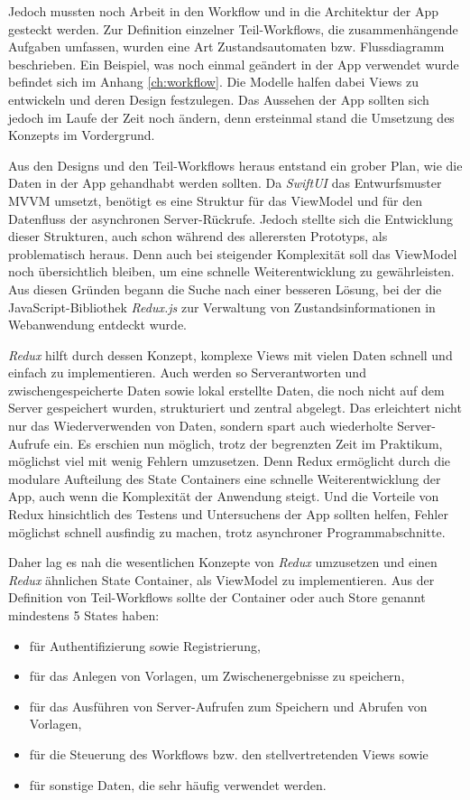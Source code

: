 \documentclass[nomenclature, oneside, 150]{HSMW-Thesis}
\begin{document}
		Jedoch mussten noch Arbeit in den Workflow und in die Architektur der App gesteckt werden. Zur Definition einzelner Teil-Workflows, die zusammenhängende Aufgaben umfassen, wurden eine Art Zustandsautomaten bzw. Flussdiagramm beschrieben. Ein Beispiel, was noch einmal geändert in der App verwendet wurde befindet sich im Anhang \ref{ch:workflow}. Die Modelle halfen dabei Views zu entwickeln und deren Design festzulegen. Das Aussehen der App sollten sich jedoch im Laufe der Zeit noch ändern, denn ersteinmal stand die Umsetzung des Konzepts im Vordergrund.

		Aus den Designs und den Teil-Workflows heraus entstand ein grober Plan, wie die Daten in der App gehandhabt werden sollten. Da \textit{SwiftUI} das Entwurfsmuster MVVM umsetzt, benötigt es eine Struktur für das ViewModel und für den Datenfluss der asynchronen Server-Rückrufe. Jedoch stellte sich die Entwicklung dieser Strukturen, auch schon während des allerersten Prototyps, als problematisch heraus. Denn auch bei steigender Komplexität soll das ViewModel noch übersichtlich bleiben, um eine schnelle Weiterentwicklung zu gewährleisten. Aus diesen Gründen begann die Suche nach einer besseren Lösung, bei der die JavaScript-Bibliothek \textit{Redux.js} zur Verwaltung von Zustandsinformationen in Webanwendung entdeckt wurde. 

		\textit{Redux} hilft durch dessen Konzept, komplexe Views mit vielen Daten schnell und einfach zu implementieren. Auch werden so Serverantworten und zwischengespeicherte Daten sowie lokal erstellte Daten, die noch nicht auf dem Server gespeichert wurden, strukturiert und zentral abgelegt. Das erleichtert nicht nur das Wiederverwenden von Daten, sondern spart auch wiederholte Server-Aufrufe ein. Es erschien nun möglich, trotz der begrenzten Zeit im Praktikum, möglichst viel mit wenig Fehlern umzusetzen. Denn Redux ermöglicht durch die modulare Aufteilung des State Containers eine schnelle Weiterentwicklung der App, auch wenn die Komplexität der Anwendung steigt. Und die Vorteile von Redux hinsichtlich des Testens und Untersuchens der App sollten helfen, Fehler möglichst schnell ausfindig zu machen, trotz asynchroner Programmabschnitte.

		Daher lag es nah die wesentlichen Konzepte von \textit{Redux} umzusetzen und einen \textit{Redux} ähnlichen State Container, als ViewModel zu implementieren. Aus der Definition von Teil-Workflows sollte der Container oder auch Store genannt mindestens 5 States haben: 
		\begin{itemize}
			\item für Authentifizierung sowie Registrierung,
			\item für das Anlegen von Vorlagen, um Zwischenergebnisse zu speichern,
			\item für das Ausführen von Server-Aufrufen zum Speichern und Abrufen von Vorlagen, 
			\item für die Steuerung des Workflows bzw. den stellvertretenden Views sowie
			\item für sonstige Daten, die sehr häufig verwendet werden.
		\end{itemize}
		
\end{document}
